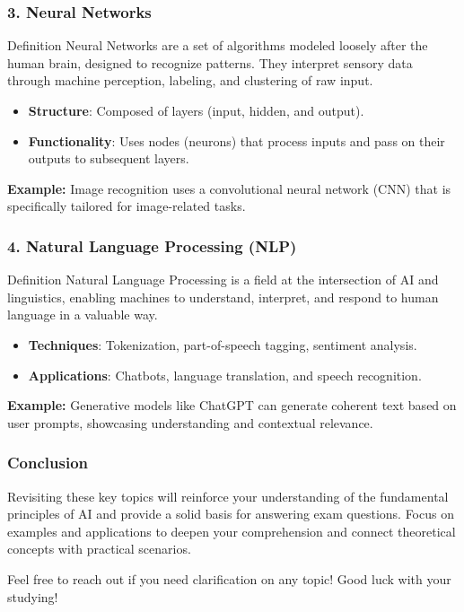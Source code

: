 \documentclass[aspectratio=169]{beamer}
\begin{document}
\begin{frame}[fragile]
    \frametitle{3. Neural Networks}
    \begin{block}{Definition}
        Neural Networks are a set of algorithms modeled loosely after the human brain, designed to recognize patterns.
        They interpret sensory data through machine perception, labeling, and clustering of raw input.
    \end{block}

    \begin{itemize}
        \item \textbf{Structure}: Composed of layers (input, hidden, and output).
        \item \textbf{Functionality}: Uses nodes (neurons) that process inputs and pass on their outputs to subsequent layers.
    \end{itemize}

    \begin{example}
        \textbf{Example:} Image recognition uses a convolutional neural network (CNN) that is specifically tailored for image-related tasks.
    \end{example}
\end{frame}

\begin{frame}[fragile]
    \frametitle{4. Natural Language Processing (NLP)}
    \begin{block}{Definition}
        Natural Language Processing is a field at the intersection of AI and linguistics, enabling machines to understand, interpret, 
        and respond to human language in a valuable way.
    \end{block}

    \begin{itemize}
        \item \textbf{Techniques}: Tokenization, part-of-speech tagging, sentiment analysis.
        \item \textbf{Applications}: Chatbots, language translation, and speech recognition.
    \end{itemize}

    \begin{example}
        \textbf{Example:} Generative models like ChatGPT can generate coherent text based on user prompts, showcasing understanding and contextual relevance.
    \end{example}
\end{frame}

\begin{frame}[fragile]
    \frametitle{Conclusion}
    Revisiting these key topics will reinforce your understanding of the fundamental principles of AI and provide a solid basis for answering exam questions. 
    Focus on examples and applications to deepen your comprehension and connect theoretical concepts with practical scenarios.
    
    Feel free to reach out if you need clarification on any topic! Good luck with your studying!
\end{frame}
\end{document}
